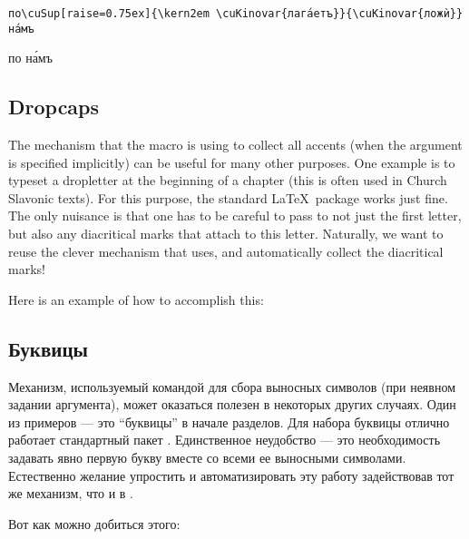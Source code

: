\begin{verbatim}
по\cuSup[raise=0.75ex]{\kern2em \cuKinovar{лага́етъ}}{\cuKinovar{ложѝ}} на́мъ
\end{verbatim}

\begin{churchslavonic}
по на́мъ
\end{churchslavonic}

\begin{EN}
\subsection{Dropcaps}
The mechanism that the  macro is using to collect all accents
(when the argument is specified implicitly) can be useful for
many other purposes. One example is to typeset a dropletter at the beginning of a chapter
(this is often used in Church Slavonic texts). For this purpose, the standard \LaTeX\ package
 works just fine. The only nuisance is that one has to be careful to
pass to  not just the first letter, but also any diacritical marks that
attach to this letter. Naturally, we want to reuse the
clever mechanism that  uses, and automatically collect the diacritical marks!

Here is an example of how to accomplish this:
\end{EN}

\begin{RU}
\subsection{Буквицы}
Механизм, используемый командой  для сбора выносных символов (при неявном задании аргумента), может оказаться полезен
в некоторых других случаях. Один из примеров --- это ``буквицы'' в начале разделов. Для набора буквицы отлично работает стандартный
пакет . Единственное неудобство --- это необходимость задавать явно первую букву вместе со всеми ее выносными символами.
Естественно желание упростить и автоматизировать эту работу задействовав тот же механизм, что и в .

Вот как можно добиться этого:
\end{RU}

